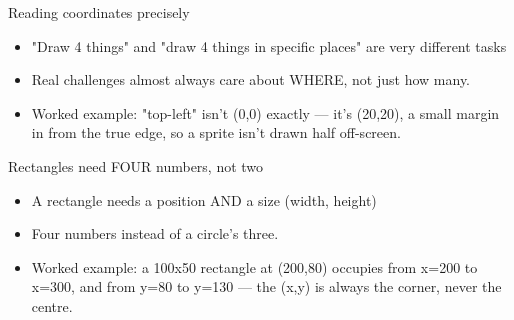 \documentclass[aspectratio=169]{beamer}
\begin{document}
\begin{frame}{Reading coordinates precisely}
    \large
    \begin{itemize}
        \item "Draw 4 things" and "draw 4 things in specific places" are very different tasks
        \item Real challenges almost always care about WHERE, not just how many.
        \item Worked example: "top-left" isn't (0,0) exactly — it's (20,20), a small margin in from the true edge, so a sprite isn't drawn half off-screen.
    \end{itemize}

    \begin{center}
    \end{center}
\end{frame}


\begin{frame}{Rectangles need FOUR numbers, not two}
    \large
    \begin{itemize}
        \item A rectangle needs a position AND a size (width, height)
        \item Four numbers instead of a circle's three.
        \item Worked example: a 100x50 rectangle at (200,80) occupies from x=200 to x=300, and from y=80 to y=130 — the (x,y) is always the corner, never the centre.
    \end{itemize}

    \begin{center}
    \end{center}
\end{frame}
\end{document}
